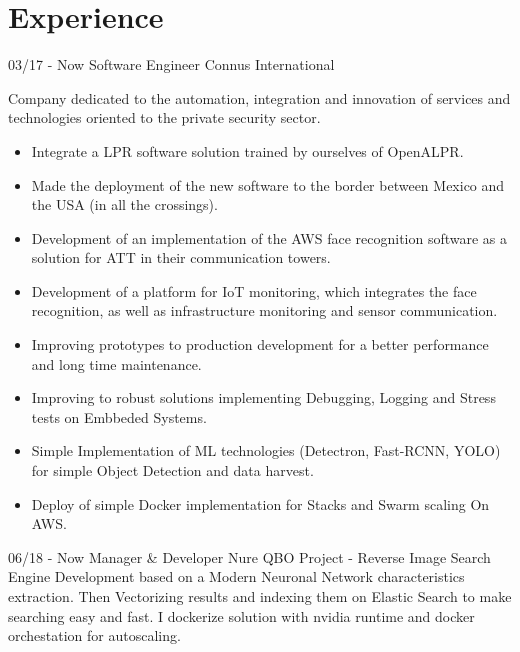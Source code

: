 \documentclass[]{friggeri-cv}
\begin{document}
\section{Experience}
\begin{entrylist}
  \entry
    {03/17 - Now}
    {Software Engineer}
    {Connus International}
    {Company dedicated to the automation, integration and innovation of services and technologies oriented to the private security sector.\\\vspace{-3mm}
    \begin{itemize}
    \addtolength{\itemindent}{-4mm}
    	\item Integrate a LPR software solution trained by
ourselves of OpenALPR.\vspace{1mm}
    	\item Made the deployment of the new software to the border between
Mexico and the USA (in all the crossings).\vspace{1mm}
    	\item Development of an implementation of the AWS face recognition software as a solution for ATT in their communication towers.\vspace{1mm}
    	\item Development of a platform for IoT monitoring, which
integrates the face recognition, as well as infrastructure monitoring and sensor communication.\vspace{1mm}
		\item Improving prototypes to production development for a better performance and long time maintenance.\vspace{1mm}
		\item Improving to robust solutions implementing Debugging, Logging and Stress tests on Embbeded Systems.\vspace{1mm}
		\item Simple Implementation of ML technologies (Detectron, Fast-RCNN, YOLO) for simple Object Detection and data harvest.\vspace{1mm}
		\item Deploy of simple Docker implementation for Stacks and Swarm scaling On AWS.\vspace{1mm}
	\end{itemize}
    }
  \entry
    {06/18 - Now}
    {Manager \& Developer}
    {Nure\vspace{1mm}}
    {QBO Project - Reverse Image Search Engine Development based on a Modern Neuronal Network characteristics extraction. Then Vectorizing results and indexing them on Elastic Search to make searching easy and fast. I dockerize solution with nvidia runtime and docker orchestation for autoscaling.\\}

\end{entrylist}
\end{document}
